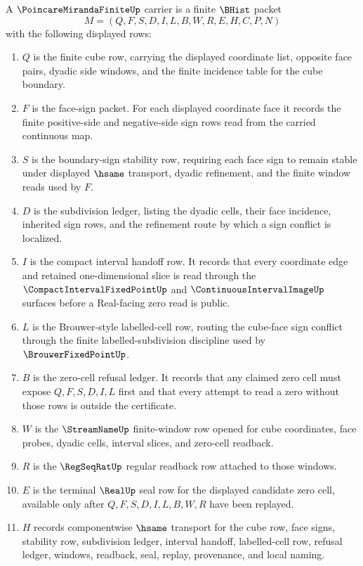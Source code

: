 \begin{definition}
\label{def:poincare-miranda-finite-carrier}
A $\PoincareMirandaFiniteUp$ carrier is a finite $\BHist$ packet
$$
M=(Q,F,S,D,I,L,B,W,R,E,H,C,P,N)
$$
with the following displayed rows:
\begin{enumerate}
\item $Q$ is the finite cube row, carrying the displayed coordinate list, opposite face pairs, dyadic side windows, and the finite incidence table for the cube boundary.
\item $F$ is the face-sign packet. For each displayed coordinate face it records the finite positive-side and negative-side sign rows read from the carried continuous map.
\item $S$ is the boundary-sign stability row, requiring each face sign to remain stable under displayed $\hsame$ transport, dyadic refinement, and the finite window reads used by $F$.
\item $D$ is the subdivision ledger, listing the dyadic cells, their face incidence, inherited sign rows, and the refinement route by which a sign conflict is localized.
\item $I$ is the compact interval handoff row. It records that every coordinate edge and retained one-dimensional slice is read through the $\CompactIntervalFixedPointUp$ and $\ContinuousIntervalImageUp$ surfaces before a Real-facing zero read is public.
\item $L$ is the Brouwer-style labelled-cell row, routing the cube-face sign conflict through the finite labelled-subdivision discipline used by $\BrouwerFixedPointUp$.
\item $B$ is the zero-cell refusal ledger. It records that any claimed zero cell must expose $Q,F,S,D,I,L$ first and that every attempt to read a zero without those rows is outside the certificate.
\item $W$ is the $\StreamNameUp$ finite-window row opened for cube coordinates, face probes, dyadic cells, interval slices, and zero-cell readback.
\item $R$ is the $\RegSeqRatUp$ regular readback row attached to those windows.
\item $E$ is the terminal $\RealUp$ seal row for the displayed candidate zero cell, available only after $Q,F,S,D,I,L,B,W,R$ have been replayed.
\item $H$ records componentwise $\hsame$ transport for the cube row, face signs, stability row, subdivision ledger, interval handoff, labelled-cell row, refusal ledger, windows, readback, seal, replay, provenance, and local naming.

\end{enumerate}
\end{definition}
